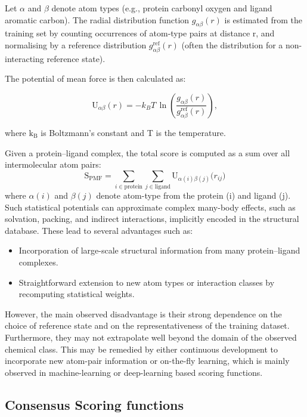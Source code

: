 \documentclass[12pt]{article}
\begin{document}
Let $\alpha$ and $\beta$ denote atom types (e.g., protein carbonyl oxygen and ligand aromatic carbon). The radial distribution function $g_{\alpha\beta}(r)$ is estimated from the training set by counting occurrences of atom-type pairs at distance r, and normalising by a reference distribution $g_{\alpha\beta}^{\text{ref}}(r)$ (often the distribution for a non-interacting reference state). 

The potential of mean force is then calculated as:

\begin{equation}
    \textrm{U}_{\alpha\beta}(r) = - k_B T \, \ln \left( \frac{g_{\alpha\beta}(r)}{g_{\alpha\beta}^{\text{ref}}(r)} \right),
\label{eq:PMF1}
\end{equation}

where $\textrm{k}_\textrm{B}$ is Boltzmann's constant and T is the temperature.

Given a protein--ligand complex, the total score is computed as a sum over all intermolecular atom pairs:
\begin{equation}
    \textrm{S}_{\textrm{PMF}} = \sum_{i \in \textrm{protein}} \sum_{j \in \textrm{ligand}} \textrm{U}_{\alpha(i)\beta(j)}\bigl(r_{ij}\bigr)
\label{eq:PMF2}
\end{equation}
where $\alpha(i)$ and $\beta(j)$ denote atom-type from the protein (i) and ligand (j).
Such statistical potentials can approximate complex many-body effects, such as solvation, packing, and indirect interactions, implicitly encoded in the structural database. These lead to several advantages such as:

\begin{itemize}
    \item Incorporation of large-scale structural information from many protein--ligand complexes.
    \item Straightforward extension to new atom types or interaction classes by recomputing statistical weights.
\end{itemize}

However, the main observed disadvantage is their strong dependence on the choice of reference state and on the representativeness of the training dataset. Furthermore, they may not extrapolate well beyond the domain of the observed chemical class. This may be remedied by either continuous development to incorporate new atom-pair information or on-the-fly learning, which is mainly observed in machine-learning or deep-learning based scoring functions.

\subsection{Consensus Scoring functions}
\end{document}
